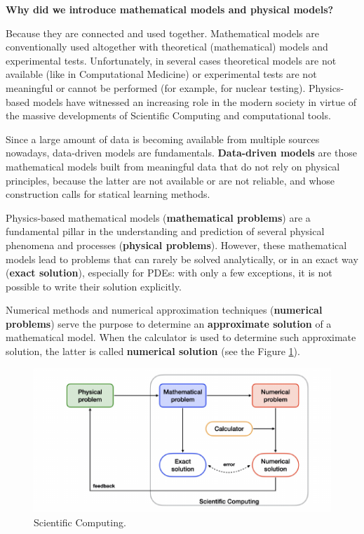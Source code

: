 \newpage

\begin{flushleft}
    \textcolor{Green3}{ \textbf{Why did we introduce mathematical models and physical models?}}
\end{flushleft}
Because they are connected and used together. Mathematical models are conventionally used altogether with theoretical (mathematical) models and experimental tests. Unfortunately, in several cases theoretical models are not available (like in Computational Medicine) or experimental tests are not meaningful or cannot be performed (for example, for nuclear testing). Physics-based models have witnessed an increasing role in the modern society in virtue of the massive developments of Scientific Computing and computational tools.

\highspace
Since a large amount of data is becoming available from multiple sources nowadays, data-driven models are fundamentals. \textbf{Data-driven models} are those mathematical models built from meaningful data that do not rely on physical principles, because the latter are not available or are not reliable, and whose construction calls for statical learning methods.

\highspace
Physics-based mathematical models (\textbf{mathematical problems}) are a fundamental pillar in the understanding and prediction of several physical phenomena and processes (\textbf{physical problems}). However, these mathematical models lead to problems that can rarely be solved analytically, or in an exact way (\textbf{exact solution}), especially for PDEs: with only a few exceptions, it is not possible to write their solution explicitly.

\highspace
Numerical methods and numerical approximation techniques (\textbf{numerical problems}) serve the purpose to determine an \textbf{approximate solution} of a mathematical model. When the calculator is used to determine such approximate solution, the latter is called \textbf{numerical solution} (see the Figure \ref{fig: scientific computing}).

\begin{figure}[!htp]
    \centering
    \includegraphics[width=\textwidth]{img/models-1.pdf}
    \caption{Scientific Computing.}
    \label{fig: scientific computing}
\end{figure}